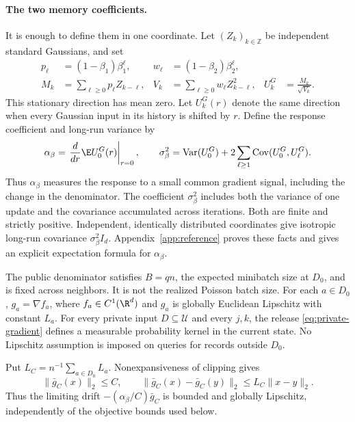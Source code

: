 \paragraph{The two memory coefficients.}
It is enough to define them in one coordinate. Let $(Z_k)_{k\in\mathbb Z}$
be independent standard Gaussians, and set
\begin{equation}\label{eq:reference}
 \begin{aligned}
 p_\ell&=(1-\beta_1)\beta_1^\ell,
 &w_\ell&=(1-\beta_2)\beta_2^\ell,\\
 M_k&=\sum_{\ell\geq0}p_\ell Z_{k-\ell},
 &V_k&=\sum_{\ell\geq0}w_\ell Z_{k-\ell}^2,
 &U_k^G&=\frac{M_k}{\sqrt{V_k}}.
 \end{aligned}
\end{equation}
This stationary direction has mean zero. Let $U_k^G(r)$ denote the same
direction when every Gaussian input in its history is shifted by $r$.
Define the response coefficient and long-run variance by
\begin{equation}\label{eq:memory-coefficients}
 \alpha_\beta=
 \left.\frac{d}{dr}\E U_0^G(r)\right|_{r=0},\qquad
 \sigma_\beta^2=
 \operatorname{Var}(U_0^G)+2\sum_{\ell\geq1}
             \operatorname{Cov}(U_0^G,U_\ell^G).
\end{equation}
Thus $\alpha_\beta$ measures the response to a small common gradient
signal, including the change in the denominator. The coefficient
$\sigma_\beta^2$ includes both the variance of one update and the
covariance accumulated across iterations. Both are finite and strictly
positive. Independent, identically distributed coordinates give isotropic
long-run covariance $\sigma_\beta^2I_d$.
Appendix~\ref{app:reference} proves these facts and gives an explicit
expectation formula for $\alpha_\beta$.

\begin{assumption}\label{ass:queries}
The public denominator satisfies $B=qn$, the expected minibatch size at
$D_0$, and is fixed across neighbors. It is not the realized Poisson batch
size. For each $a\in D_0$,
$g_a=\nabla f_a$, where
$f_a\in C^1(\R^d)$ and $g_a$ is globally Euclidean Lipschitz with constant
$L_a$. For every private input $D\subseteq\mathcal U$ and every
$j,k$, the release \eqref{eq:private-gradient} defines a measurable
probability kernel in the current state. No Lipschitz assumption is imposed
on queries for records outside $D_0$.
\end{assumption}
Put $L_C=n^{-1}\sum_{a\in D_0}L_a$. Nonexpansiveness of clipping gives
\[
 \|\bar g_C(x)\|_2\leq C,\qquad
 \|\bar g_C(x)-\bar g_C(y)\|_2\leq L_C\|x-y\|_2.
\]
Thus the limiting drift $-(\alpha_\beta/C)\bar g_C$ is bounded and globally
Lipschitz, independently of the objective bounds used below.

